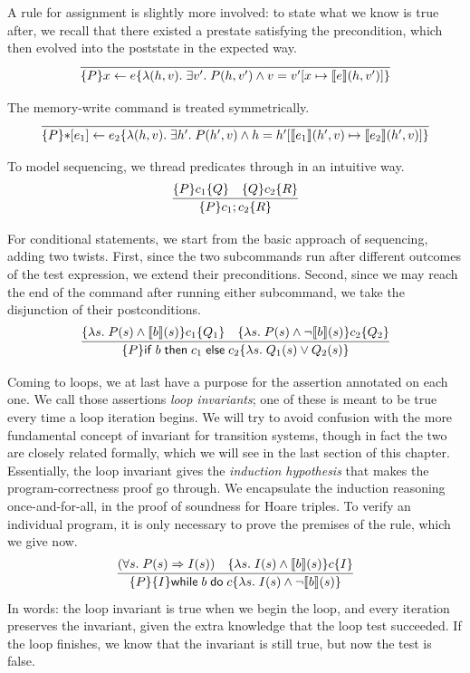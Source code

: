 \documentclass{amsbook}
\theoremstyle{definition}
\theoremstyle{remark}
\numberwithin{section}{chapter}
\numberwithin{equation}{chapter}
\begin{document}
A rule for assignment is slightly more involved: to state what we know is true after, we recall that there existed a prestate satisfying the precondition, which then evolved into the poststate in the expected way.
$$\infer{\hoare{P}{\assign{x}{e}}{\lambda (h, v). \; \exists v'. \; P(h, v') \land v = \mupd{v'}{x}{\denote{e}(h, v')}}}{}$$

The memory-write command is treated symmetrically.
$$\infer{\hoare{P}{\writeto{e_1}{e_2}}{\lambda (h, v). \; \exists h'. \; P(h', v) \land h = \mupd{h'}{\denote{e_1}(h', v)}{\denote{e_2}(h', v)}}}{}$$

To model sequencing, we thread predicates through in an intuitive way.
$$\infer{\hoare{P}{c_1; c_2}{R}}{
  \hoare{P}{c_1}{Q}
  & \hoare{Q}{c_2}{R}
}$$

For conditional statements, we start from the basic approach of sequencing, adding two twists.
First, since the two subcommands run after different outcomes of the test expression, we extend their preconditions.
Second, since we may reach the end of the command after running either subcommand, we take the disjunction of their postconditions.
$$\infer{\hoare{P}{\ifte{b}{c_1}{c_2}}{\lambda s. \; Q_1(s) \lor Q_2(s)}}{
  \hoare{\lambda s. \; P(s) \land \denote{b}(s)}{c_1}{Q_1}
  & \hoare{\lambda s. \; P(s) \land \neg \denote{b}(s)}{c_2}{Q_2}
}$$

Coming to loops, we at last have a purpose for the assertion annotated on each one.
\invariants
We call those assertions \emph{loop invariants}; one of these is meant to be true every time a loop iteration begins.
We will try to avoid confusion with the more fundamental concept of invariant for transition systems, though in fact the two are closely related formally, which we will see in the last section of this chapter.
Essentially, the loop invariant gives the \emph{induction hypothesis} that makes the program-correctness proof go through.
We encapsulate the induction reasoning once-and-for-all, in the proof of soundness for Hoare triples.
To verify an individual program, it is only necessary to prove the premises of the rule, which we give now.
$$\infer{\hoare{P}{\{I\} \while{b}{c}}{\lambda s. \; I(s) \land \neg \denote{b}(s)}}{
  (\forall s. \; P(s) \Rightarrow I(s))
  & \hoare{\lambda s. \; I(s) \land \denote{b}(s)}{c}{I}
}$$
In words: the loop invariant is true when we begin the loop, and every iteration preserves the invariant, given the extra knowledge that the loop test succeeded.
If the loop finishes, we know that the invariant is still true, but now the test is false.
\end{document}
